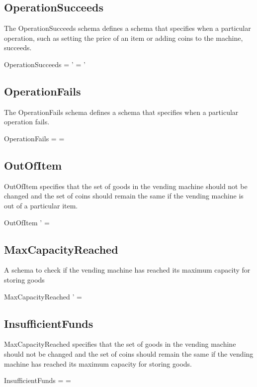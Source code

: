 \documentclass{article}
\begin{document}
\subsection{OperationSucceeds}
The OperationSucceeds schema defines a schema that specifies when a particular operation, such as setting the price of an item or adding coins to the machine, succeeds.
\begin{schema}{OperationSucceeds}
 = '
 = '
\end{schema}





\subsection{OperationFails}
The OperationFails schema defines a schema that specifies when a particular operation fails.
\begin{schema}{OperationFails}
 = 
 = 
\end{schema}



\subsection{OutOfItem}
OutOfItem specifies that the set of goods in the vending machine should not be changed and the set of coins should remain the same if the vending machine is out of a particular item.
\begin{schema}{OutOfItem}
 \neq {}'
 = 
\end{schema}



\subsection{MaxCapacityReached}
A schema to check if the vending machine has reached its maximum capacity for storing goods
\begin{schema}{MaxCapacityReached}
 \neq {}'
 = 
\end{schema}

\subsection{InsufficientFunds}
MaxCapacityReached specifies that the set of goods in the vending machine should not be changed and the set of coins should remain the same if the vending machine has reached its maximum capacity for storing goods.
\begin{schema}{InsufficientFunds}
 = 
 = 
\end{schema}
\end{document}
